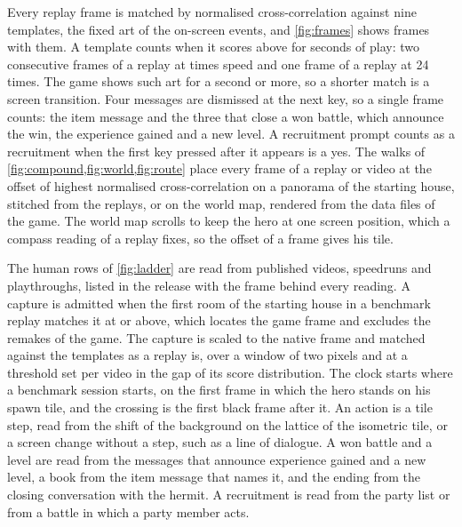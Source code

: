 \documentclass{article} %
\begin{document}
Every replay frame is matched by normalised cross-correlation against nine templates, the fixed art of the on-screen events, and \cref{fig:frames} shows frames with them. A template counts when it scores above \ReplayThreshold{} for \ReplayHold{} seconds of play: two consecutive frames of a replay at \DefaultReplaySpeed{} times speed and one frame of a replay at 24 times. The game shows such art for a second or more, so a shorter match is a screen transition. Four messages are dismissed at the next key, so a single frame counts: the item message and the three that close a won battle, which announce the win, the experience gained and a new level. A recruitment prompt counts as a recruitment when the first key pressed after it appears is a yes. The walks of \cref{fig:compound,fig:world,fig:route} place every frame of a replay or video at the offset of highest normalised cross-correlation on a panorama of the starting house, stitched from the replays, or on the world map, rendered from the data files of the game. The world map scrolls to keep the hero at one screen position, which a compass reading of a replay fixes, so the offset of a frame gives his tile.

The human rows of \cref{fig:ladder} are read from \NhumanVideos{} published videos, \NhumanSpeedruns{} speedruns and \NhumanPlaythroughs{} playthroughs, listed in the release with the frame behind every reading. A capture is admitted when the first room of the starting house in a benchmark replay matches it at \HumanRoomGate{} or above, which locates the game frame and excludes the remakes of the game. The capture is scaled to the native frame and matched against the templates as a replay is, over a window of two pixels and at a threshold set per video in the gap of its score distribution. The clock starts where a benchmark session starts, on the first frame in which the hero stands on his spawn tile, and the crossing is the first black frame after it. An action is a tile step, read from the shift of the background on the lattice of the isometric tile, or a screen change without a step, such as a line of dialogue. A won battle and a level are read from the messages that announce experience gained and a new level, a book from the item message that names it, and the ending from the closing conversation with the hermit. A recruitment is read from the party list or from a battle in which a party member acts.
\end{document}
